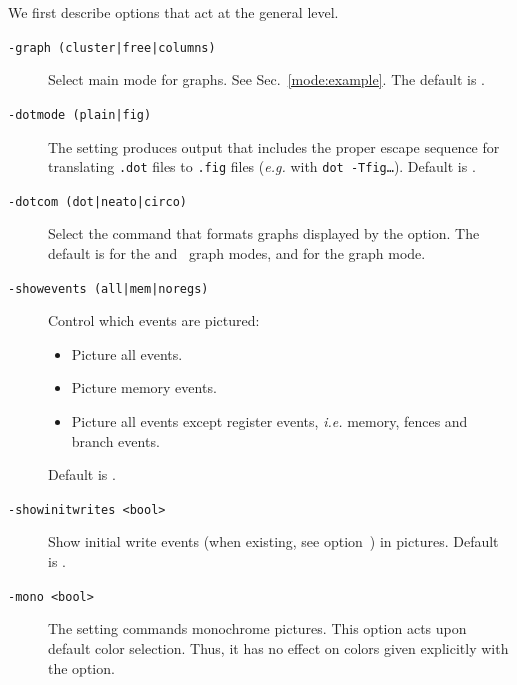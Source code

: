 We first describe options that act at the general level.
\begin{description}
\item[{\tt -graph (cluster|free|columns)}] Select main mode for graphs.
See Sec.~\ref{mode:example}. The default is .
\item[{\tt -dotmode (plain|fig)}] The setting 
produces output that includes the proper escape
sequence for translating \texttt{.dot} files
to \texttt{.fig} files (\emph{e.g.} with \texttt{dot -Tfig\ldots}).
Default is .
\item[{\tt -dotcom (dot|neato|circo)}] Select the command that formats
graphs displayed by the  option.
The default is  for the  and~ graph modes,
and  for the  graph mode.

\item[{\tt -showevents (all|mem|noregs)}] Control which events are
pictured:
\begin{itemize}
\item {} Picture all events.
\item {} Picture memory events.
\item {} Picture all events except register events,
\emph{i.e.} memory, fences and branch events.
\end{itemize}
Default is .

\item[{\tt -showinitwrites <bool>}] Show initial write events
(when existing, see option~)
in pictures. Default is .

\item[{\tt -mono <bool>}] The setting  commands monochrome
pictures. This option acts upon default color selection. Thus, it
has no effect on colors given explicitly with the
 option.


\end{description}
